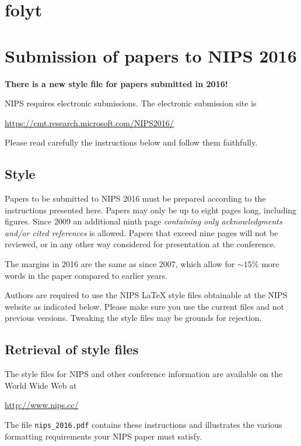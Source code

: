 \documentclass{article}
\begin{document}
\section{folyt}

\section{Submission of papers to NIPS 2016}

\textbf{There is a new style file for papers submitted in 2016!}

NIPS requires electronic submissions.  The electronic submission site
is
\begin{center}
  \url{https://cmt.research.microsoft.com/NIPS2016/}
\end{center}

Please read carefully the instructions below and follow them
faithfully.

\subsection{Style}

Papers to be submitted to NIPS 2016 must be prepared according to the
instructions presented here. Papers may only be up to eight pages
long, including figures. Since 2009 an additional ninth page
\emph{containing only acknowledgments and/or cited references} is
allowed. Papers that exceed nine pages will not be reviewed, or in any
other way considered for presentation at the conference.

The margins in 2016 are the same as since 2007, which allow for
$\sim$$15\%$ more words in the paper compared to earlier years.

Authors are required to use the NIPS \LaTeX{} style files obtainable
at the NIPS website as indicated below. Please make sure you use the
current files and not previous versions. Tweaking the style files may
be grounds for rejection.

\subsection{Retrieval of style files}

The style files for NIPS and other conference information are
available on the World Wide Web at
\begin{center}
  \url{http://www.nips.cc/}
\end{center}
The file \verb+nips_2016.pdf+ contains these instructions and
illustrates the various formatting requirements your NIPS paper must
satisfy.
\end{document}
